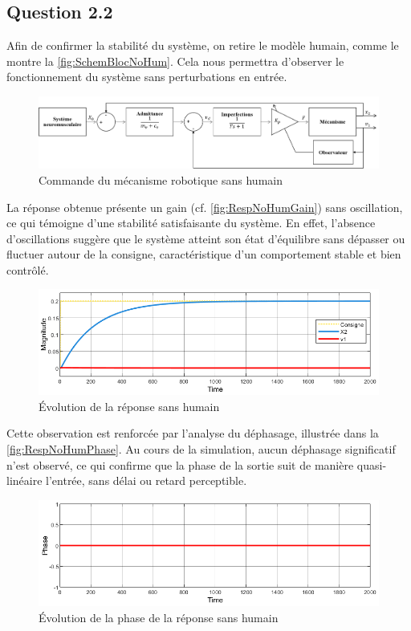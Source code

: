 \documentclass[a4paper,12pt]{article}
\begin{document}
    
    \subsection{Question 2.2}
    Afin de confirmer la stabilité du système, on retire le modèle humain, comme le montre la \autoref{fig:SchemBlocNoHum}. Cela nous permettra d'observer le fonctionnement du système sans perturbations en entrée.
    \begin{figure}[H]
        \centering
        \includegraphics[width=16cm]{./img/SchemaBlocNoHum.png}
        \caption{Commande du mécanisme robotique sans humain\label{fig:SchemBlocNoHum}}
    \end{figure}

    La réponse obtenue présente un gain (cf. \autoref{fig:RespNoHumGain}) sans oscillation, ce qui témoigne d'une stabilité satisfaisante du système. En effet, l'absence d'oscillations suggère que le système atteint son état d'équilibre sans dépasser ou fluctuer autour de la consigne, caractéristique d'un comportement stable et bien contrôlé.
    \begin{figure}[H]
        \centering
        \includegraphics[width=16cm]{./img/response_NoHum_Gain.png}
        \caption{Évolution de la réponse sans humain\label{fig:RespNoHumGain}}
    \end{figure}
    
    Cette observation est renforcée par l'analyse du déphasage, illustrée dans la \autoref{fig:RespNoHumPhase}. Au cours de la simulation, aucun déphasage significatif n'est observé, ce qui confirme que la phase de la sortie suit de manière quasi-linéaire l'entrée, sans délai ou retard perceptible.
    \begin{figure}[H]
        \centering
        \includegraphics[width=16cm]{./img/response_NoHum_Phase.png}
        \caption{Évolution de la phase de la réponse sans humain\label{fig:RespNoHumPhase}}
    \end{figure}
\end{document}
